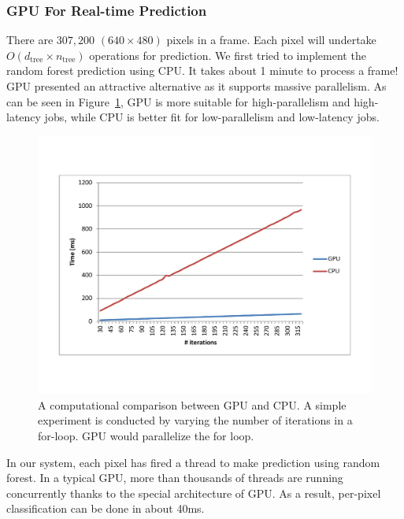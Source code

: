 \subsubsection{GPU For Real-time Prediction}
There are $307,200$ $(640\times 480)$ pixels in a frame. Each pixel will undertake $O(d_{\text{tree}}\times n_{\text{tree}})$ operations for prediction. We first tried to implement the random forest prediction using CPU. It takes about 1 minute to process a frame! GPU presented an attractive alternative as it supports massive parallelism. As can be seen in Figure~\ref{fig: GPUvsCPU}, GPU is more suitable for high-parallelism and high-latency jobs, while CPU is better fit for low-parallelism and low-latency jobs.

\begin{figure}
	\includegraphics[width=0.45 \textwidth]{fig/GPUvsCPU.pdf}
    \caption{A computational comparison between GPU and CPU. A simple experiment is conducted by varying the number of iterations in a for-loop. GPU would parallelize the for loop.}
    \label{fig: GPUvsCPU}
\end{figure}

In our system, each pixel has fired a thread to make prediction using random forest. In a typical GPU, more than thousands of threads are running concurrently thanks to the special architecture of GPU. As a result, per-pixel classification can be done in about 40ms.
